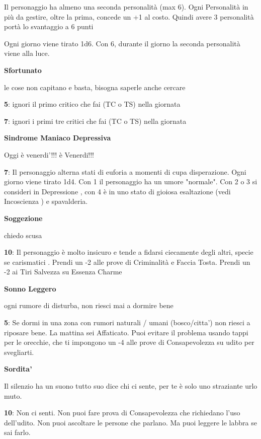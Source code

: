 \documentclass[a4paper,11pt,twoside,openany]{book}
\begin{document}
Il personaggio ha almeno una seconda personalità (max 6).
Ogni Personalità in più da gestire, oltre la prima, concede un +1 al costo.
Quindi avere 3 personalità portà lo svantaggio a 6 punti

Ogni giorno viene tirato 1d6. Con 6, durante il giorno la seconda personalità viene alla luce.

\textbf{Sfortunato}

le cose non capitano e basta, bisogna saperle anche cercare

\textbf{5}: ignori il primo critico che fai (TC o TS) nella giornata

\textbf{7}: ignori i primi tre critici che fai (TC o TS) nella giornata

\textbf{Sindrome Maniaco Depressiva}

Oggi è venerdi'!!! è Venerdi!!!

\textbf{7}: Il personaggio alterna stati di euforia a momenti di cupa disperazione. Ogni giorno viene tirato 1d4. Con 1 il personaggio ha un umore "normale". Con 2 o 3 si consideri in Depressione , con 4 è in uno stato di gioiosa esaltazione (vedi Incoscienza ) e spavalderia.

\textbf{Soggezione}

chiedo scusa

\textbf{10}: Il personaggio è molto insicuro e tende a fidarsi ciecamente degli altri, specie se carismatici . Prendi un -2 alle prove di Criminalità e Faccia Tosta.
Prendi un -2 ai Tiri Salvezza su Essenza Charme

\textbf{Sonno Leggero}

ogni rumore di disturba, non riesci mai a dormire bene

\textbf{5}: Se dormi in una zona con rumori naturali / umani (bosco/citta') non riesci a riposare bene. La mattina sei Affaticato. Puoi evitare il problema usando tappi per le orecchie, che ti impongono un -4 alle prove di Consapevolezza su udito per svegliarti.

\textbf{Sordita'}

Il silenzio ha un suono tutto suo dice chi ci sente, per te è solo uno straziante urlo muto.

\textbf{10}: Non ci senti. Non puoi fare prova di Consapevolezza che richiedano l'uso dell'udito. Non puoi ascoltare le persone che parlano. Ma puoi leggere le labbra se sai farlo.
\end{document}
